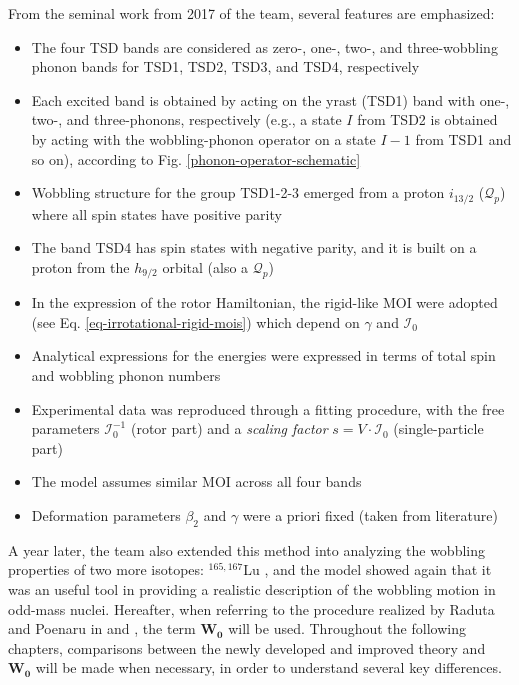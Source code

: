 From the seminal work from 2017 of the team, several features are emphasized:
\begin{itemize}
    \item The four TSD bands are considered as zero-, one-, two-, and three-wobbling phonon bands for TSD1, TSD2, TSD3, and TSD4, respectively
    \item Each excited band is obtained by acting on the yrast (TSD1) band with one-, two-, and three-phonons, respectively (e.g., a state $I$ from TSD2 is obtained by acting with the wobbling-phonon operator on a state $I-1$ from TSD1 and so on), according to Fig. \ref{phonon-operator-schematic}
    \item Wobbling structure for the group TSD1-2-3 emerged from a proton $i_{13/2}$ ($\mathcal{Q}_p$) where all spin states have positive parity
    \item The band TSD4 has spin states with negative parity, and it is built on a proton from the $h_{9/2}$ orbital (also a $\mathcal{Q}_p$)
    \item In the expression of the rotor Hamiltonian, the rigid-like MOI were adopted (see Eq. \ref{eq-irrotational-rigid-mois}) which depend on $\gamma$ and $\mathcal{I}_0$
    \item Analytical expressions for the energies were expressed in terms of total spin and wobbling phonon numbers
    \item Experimental data was reproduced through a fitting procedure, with the free parameters $\mathcal{I}_0^{-1}$ (rotor part) and a \emph{scaling factor} $s=V\cdot \mathcal{I}_0$ (single-particle part)
    \item The model assumes similar MOI across all four bands
    \item Deformation parameters $\beta_2$ and $\gamma$ were a priori fixed (taken from literature)
\end{itemize}

A year later, the team also extended this method into analyzing the wobbling properties of two more isotopes: $^{165,167}$Lu \cite{raduta2018wobbling}, and the model showed again that it was an useful tool in providing a realistic description of the wobbling motion in odd-mass nuclei. Hereafter, when referring to the procedure realized by Raduta and Poenaru in \cite{raduta2017semiclassical} and \cite{raduta2018wobbling}, the term $\mathbf{W_0}$ will be used. Throughout the following chapters, comparisons between the newly developed and improved theory and $\mathbf{W_0}$ will be made when necessary, in order to understand several key differences.

